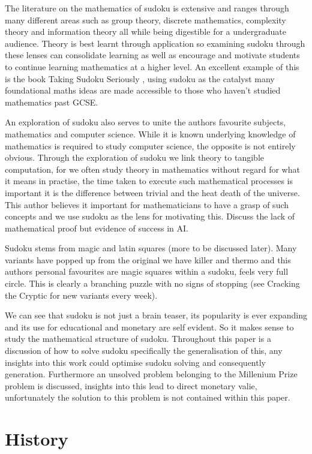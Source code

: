 \documentclass[a4paper,11pt]{report}
\begin{document}
The literature on the mathematics of sudoku is extensive and ranges through many different areas such as group theory, discrete mathematics, complexity theory and information theory all while being digestible for a undergraduate audience. Theory is best learnt through application so examining sudoku through these lenses can consolidate learning as well as encourage and motivate students to continue learning mathematics at a higher level. An excellent example of this is the book Taking Sudoku Seriously \cite{}, using sudoku as the catalyst many foundational maths ideas are made accessible to those who haven't studied mathematics past GCSE.

An exploration of sudoku also serves to unite the authors favourite subjects, mathematics and computer science. While it is known underlying knowledge of mathematics is required to study computer science, the opposite is not entirely obvious. Through the exploration of sudoku we link theory to tangible computation, for we often study theory in mathematics without regard for what it means in practise, the time taken to execute such mathematical processes is important it is the difference between trivial and the heat death of the universe. This author believes it important for mathematicians to have a grasp of such concepts and we use sudoku as the lens for motivating this. Discuss the lack of mathematical proof but evidence of success in AI.

Sudoku stems from magic and latin squares (more to be discussed later). Many variants have popped up from the original we have killer and thermo and this authors personal favourites are magic squares within a sudoku, feels very full circle. This is clearly a branching puzzle with no signs of stopping (see Cracking the Cryptic for new variants every week).

We can see that sudoku is not just a brain teaser, its popularity is ever expanding and its use for educational and monetary are self evident. So it makes sense to study the mathematical structure of sudoku.  Throughout this paper is a discussion of how to solve sudoku specifically the generalisation of this, any insights into this work could optimise sudoku solving and consequently generation. Furthermore an unsolved problem belonging to the Millenium Prize problem is discussed, insights into this lead to direct monetary valie, unfortunately the solution to this problem is not contained within this paper.

\section{History}
\end{document}
